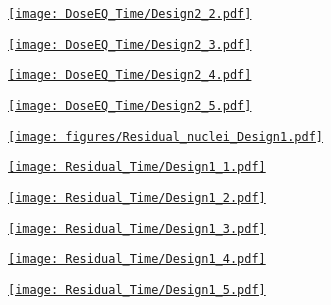 \documentclass[xcolor={dvipsnames}]{beamer}
\begin{document}
\begin{frame}[plain]
 \hypertarget{Dose_equivalent_hour_Design2}{\hyperlink{coolingtimesprev_Design2}{\texttt{[image: DoseEQ\_Time/Design2\_2.pdf]}}}
\end{frame}
\begin{frame}[plain]
 \hypertarget{Dose_equivalent_day_Design2}{\hyperlink{coolingtimesprev_Design2}{\texttt{[image: DoseEQ\_Time/Design2\_3.pdf]}}}
\end{frame}
\begin{frame}[plain]
 \hypertarget{Dose_equivalent_month_Design2}{\hyperlink{coolingtimesprev_Design2}{\texttt{[image: DoseEQ\_Time/Design2\_4.pdf]}}}
\end{frame}
\begin{frame}[plain]
 \hypertarget{Dose_equivalent_year_Design2}{\hyperlink{coolingtimesprev_Design2}{\texttt{[image: DoseEQ\_Time/Design2\_5.pdf]}}}
\end{frame}
\begin{frame}[plain]
 \hypertarget{Residual_nuclei_Design1}{\hyperlink{residualtimesprev_Design1}{\texttt{[image: figures/Residual\_nuclei\_Design1.pdf]}}}
\end{frame}
\begin{frame}[plain]
 \hypertarget{Residual_nuclei_minute_Design1}{\hyperlink{residualtimesprev_Design1}{\texttt{[image: Residual\_Time/Design1\_1.pdf]}}}
\end{frame}
\begin{frame}[plain]
 \hypertarget{Residual_nuclei_hour_Design1}{\hyperlink{residualtimesprev_Design1}{\texttt{[image: Residual\_Time/Design1\_2.pdf]}}}
\end{frame}
\begin{frame}[plain]
 \hypertarget{Residual_nuclei_day_Design1}{\hyperlink{residualtimesprev_Design1}{\texttt{[image: Residual\_Time/Design1\_3.pdf]}}}
\end{frame}
\begin{frame}[plain]
 \hypertarget{Residual_nuclei_month_Design1}{\hyperlink{residualtimesprev_Design1}{\texttt{[image: Residual\_Time/Design1\_4.pdf]}}}
\end{frame}
\begin{frame}[plain]
 \hypertarget{Residual_nuclei_year_Design1}{\hyperlink{residualtimesprev_Design1}{\texttt{[image: Residual\_Time/Design1\_5.pdf]}}}
\end{frame}
\end{document}
